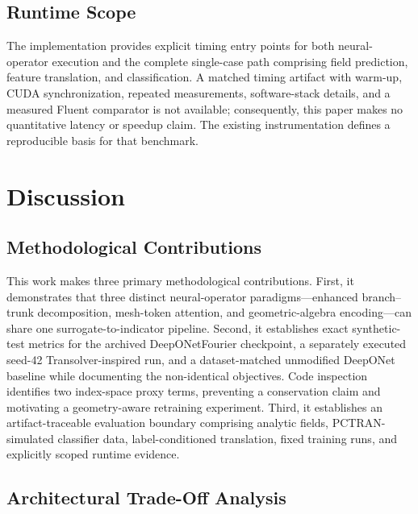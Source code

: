\documentclass[journal]{IEEEtran}
\newcommand{\added}[1]{#1}
\begin{document}
\subsection{\added{Runtime Scope}}

\added{The implementation provides explicit timing entry points for both neural-operator execution and the complete single-case path comprising field prediction, feature translation, and classification. A matched timing artifact with warm-up, CUDA synchronization, repeated measurements, software-stack details, and a measured Fluent comparator is not available; consequently, this paper makes no quantitative latency or speedup claim. The existing instrumentation defines a reproducible basis for that benchmark.}

\section{Discussion}
\label{sec:discussion}

\subsection{Methodological Contributions}

\added{This work makes three primary methodological contributions. First, it demonstrates that three distinct neural-operator paradigms---enhanced branch--trunk decomposition, mesh-token attention, and geometric-algebra encoding---can share one surrogate-to-indicator pipeline. Second, it establishes exact synthetic-test metrics for the archived DeepONetFourier checkpoint, a separately executed seed-42 Transolver-inspired run, and a dataset-matched unmodified DeepONet baseline while documenting the non-identical objectives. Code inspection identifies two index-space proxy terms, preventing a conservation claim and motivating a geometry-aware retraining experiment. Third, it establishes an artifact-traceable evaluation boundary comprising analytic fields, PCTRAN-simulated classifier data, label-conditioned translation, fixed training runs, and explicitly scoped runtime evidence.}

\subsection{Architectural Trade-Off Analysis}
\end{document}
